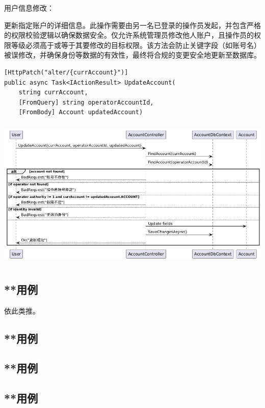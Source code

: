 \documentclass[]{article}
\begin{document}
用户信息修改：

更新指定账户的详细信息。此操作需要由另一名已登录的操作员发起，并包含严格的权限校验逻辑以确保数据安全。仅允许系统管理员修改他人账户，且操作员的权限等级必须高于或等于其要修改的目标权限。该方法会防止关键字段（如账号名）被误修改，并确保身份等数据的有效性，最终将合规的变更安全地更新至数据库。
\begin{verbatim}
[HttpPatch("alter/{currAccount}")]
public async Task<IActionResult> UpdateAccount(
    string currAccount,
    [FromQuery] string operatorAccountId,
    [FromBody] Account updatedAccount)
\end{verbatim}

\includegraphics[width=5.64167in,height=2.86458in]{media/media/image7.png}

\hypertarget{ux7528ux4f8b}{%
\subsection{**用例}\label{ux7528ux4f8b}}

依此类推。

\hypertarget{ux7528ux4f8b-1}{%
\subsection{**用例}\label{ux7528ux4f8b-1}}

\hypertarget{ux7528ux4f8b-2}{%
\subsection{**用例}\label{ux7528ux4f8b-2}}

\hypertarget{ux7528ux4f8b-3}{%
\subsection{**用例}\label{ux7528ux4f8b-3}}
\end{document}
